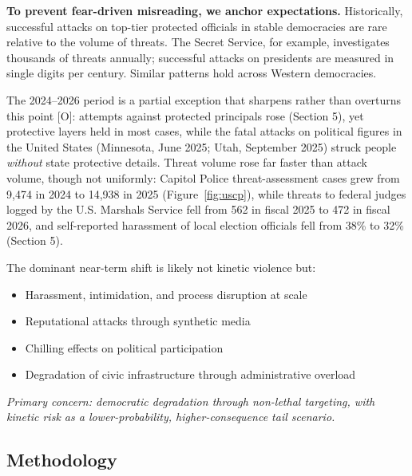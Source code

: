 \documentclass[11pt,letterpaper]{article}
\begin{document}
\textbf{To prevent fear-driven misreading, we anchor expectations.} Historically, successful attacks on top-tier protected officials in stable democracies are rare relative to the volume of threats. The Secret Service, for example, investigates thousands of threats annually; successful attacks on presidents are measured in single digits per century. Similar patterns hold across Western democracies.

The 2024--2026 period is a partial exception that sharpens rather than overturns this point [O]: attempts against protected principals rose (Section 5), yet protective layers held in most cases, while the fatal attacks on political figures in the United States (Minnesota, June 2025; Utah, September 2025) struck people \textit{without} state protective details. Threat volume rose far faster than attack volume, though not uniformly: Capitol Police threat-assessment cases grew from 9,474 in 2024 to 14,938 in 2025 (Figure~\ref{fig:uscp}), while threats to federal judges logged by the U.S. Marshals Service fell from 562 in fiscal 2025 to 472 in fiscal 2026, and self-reported harassment of local election officials fell from 38\% to 32\% (Section 5).

\begin{infobox}
The dominant near-term shift is likely not kinetic violence but:
\begin{itemize}[nosep]
  \item Harassment, intimidation, and process disruption at scale
  \item Reputational attacks through synthetic media
  \item Chilling effects on political participation
  \item Degradation of civic infrastructure through administrative overload
\end{itemize}
\textit{Primary concern: democratic degradation through non-lethal targeting, with kinetic risk as a lower-probability, higher-consequence tail scenario.}
\end{infobox}

\subsection{Methodology}
\end{document}
